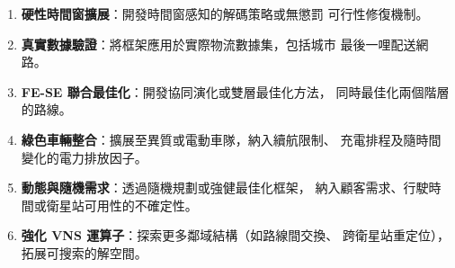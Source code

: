 \documentclass[11pt, a4paper]{article}
\numberwithin{equation}{section}
\begin{document}
\begin{enumerate}
  \item \textbf{硬性時間窗擴展}：開發時間窗感知的解碼策略或無懲罰
        可行性修復機制。
  \item \textbf{真實數據驗證}：將框架應用於實際物流數據集，包括城市
        最後一哩配送網路。
  \item \textbf{FE-SE 聯合最佳化}：開發協同演化或雙層最佳化方法，
        同時最佳化兩個階層的路線。
  \item \textbf{綠色車輛整合}：擴展至異質或電動車隊，納入續航限制、
        充電排程及隨時間變化的電力排放因子。
  \item \textbf{動態與隨機需求}：透過隨機規劃或強健最佳化框架，
        納入顧客需求、行駛時間或衛星站可用性的不確定性。
  \item \textbf{強化 VNS 運算子}：探索更多鄰域結構（如路線間交換、
        跨衛星站重定位），拓展可搜索的解空間。
\end{enumerate}

\printbibliography
\end{document}
